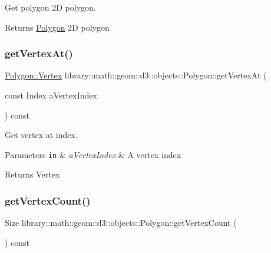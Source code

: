 Get polygon 2D polygon. 

\begin{DoxyReturn}{Returns}
\hyperlink{classlibrary_1_1math_1_1geom_1_1d3_1_1objects_1_1_polygon}{Polygon} 2D polygon 
\end{DoxyReturn}
\mbox{\label{classlibrary_1_1math_1_1geom_1_1d3_1_1objects_1_1_polygon_a3a4caaa18b07b7be061ef8b525493c5e}} 
\subsubsection{\texorpdfstring{get\+Vertex\+At()}{getVertexAt()}}
{\footnotesize\ttfamily \hyperlink{classlibrary_1_1math_1_1geom_1_1d3_1_1objects_1_1_polygon_a12c41d13f2128442c1a15b9eaa08e1d0}{Polygon\+::\+Vertex} library\+::math\+::geom\+::d3\+::objects\+::\+Polygon\+::get\+Vertex\+At (\begin{DoxyParamCaption}\item[{const Index}]{a\+Vertex\+Index }\end{DoxyParamCaption}) const}



Get vertex at index. 


\begin{DoxyParams}[1]{Parameters}
\mbox{\tt in}  & {\em a\+Vertex\+Index} & A vertex index \\
\hline
\end{DoxyParams}
\begin{DoxyReturn}{Returns}
Vertex 
\end{DoxyReturn}
\mbox{\label{classlibrary_1_1math_1_1geom_1_1d3_1_1objects_1_1_polygon_abdd6fd98e2d0aa2ddb69d842cd7e71c1}} 
\subsubsection{\texorpdfstring{get\+Vertex\+Count()}{getVertexCount()}}
{\footnotesize\ttfamily Size library\+::math\+::geom\+::d3\+::objects\+::\+Polygon\+::get\+Vertex\+Count (\begin{DoxyParamCaption}{ }\end{DoxyParamCaption}) const}



